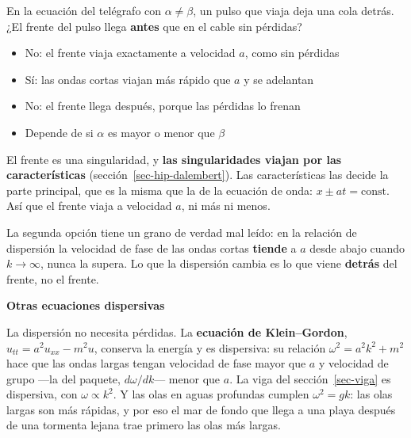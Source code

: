\documentclass[
  spanish,
  a4paper,
]{scrbook}
\providecommand{\tightlist}{%
  \setlength{\itemsep}{0pt}\setlength{\parskip}{0pt}}
\theoremstyle{definition}
\theoremstyle{plain}
\theoremstyle{definition}
\theoremstyle{plain}
\theoremstyle{definition}
\theoremstyle{remark}
\begin{document}
En la ecuación del telégrafo con \(\alpha\neq\beta\), un pulso que viaja
deja una cola detrás. ¿El frente del pulso llega \textbf{antes} que en
el cable sin pérdidas?

\begin{itemize}
\tightlist
\item
  {No: el frente viaja exactamente a velocidad \(a\), como sin pérdidas}
\item
  {Sí: las ondas cortas viajan más rápido que \(a\) y se adelantan}
\item
  {No: el frente llega después, porque las pérdidas lo frenan}
\item
  {Depende de si \(\alpha\) es mayor o menor que \(\beta\)}
\end{itemize}

El frente es una singularidad, y \textbf{las singularidades viajan por
las características} (sección~\ref{sec-hip-dalembert}). Las
características las decide la parte principal, que es la misma que la de
la ecuación de onda: \(x\pm at = \text{const}\). Así que el frente viaja
a velocidad \(a\), ni más ni menos.

La segunda opción tiene un grano de verdad mal leído: en la relación de
dispersión la velocidad de fase de las ondas cortas \textbf{tiende} a
\(a\) desde abajo cuando \(k\to\infty\), nunca la supera. Lo que la
dispersión cambia es lo que viene \textbf{detrás} del frente, no el
frente.

\begin{tcolorbox}[enhanced jigsaw, arc=.35mm, bottomrule=.15mm, breakable, colback=white, colframe=quarto-callout-note-color-frame, left=2mm, leftrule=.75mm, opacityback=0, rightrule=.15mm, toprule=.15mm]
\begin{minipage}[t]{5.5mm}
\textcolor{quarto-callout-note-color}{\faInfo}
\end{minipage}%
\begin{minipage}[t]{\textwidth - 5.5mm}

\vspace{-3mm}\textbf{Otras ecuaciones dispersivas}\vspace{3mm}

La dispersión no necesita pérdidas. La \textbf{ecuación de
Klein--Gordon}, \(u_{tt} = a^2u_{xx} - m^2u\), conserva la energía y es
dispersiva: su relación \(\omega^2 = a^2k^2 + m^2\) hace que las ondas
largas tengan velocidad de fase mayor que \(a\) y velocidad de grupo
---la del paquete, \(d\omega/dk\)--- menor que \(a\). La viga del
sección~\ref{sec-viga} es dispersiva, con \(\omega\propto k^2\). Y las
olas en aguas profundas cumplen \(\omega^2 = gk\): las olas largas son
más rápidas, y por eso el mar de fondo que llega a una playa después de
una tormenta lejana trae primero las olas más largas.

\end{minipage}%
\end{tcolorbox}
\end{document}
